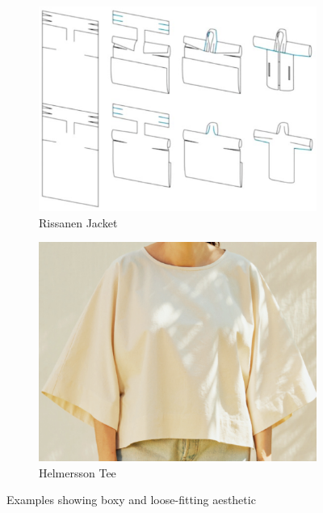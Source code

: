 \begin{figure} [H]
    \centering
    \begin{subfigure}[b]{0.55\textwidth}
        \centering
        \includegraphics[width=\textwidth]{Images/rissanen jacket.png}
        \caption{Rissanen Jacket}
        \label{fig:rissanen_jacket}
    \end{subfigure}
    \hfill
    \begin{subfigure}[b]{0.4\textwidth}
        \centering
        \includegraphics[width=\textwidth]{Images/bh tee.png}
        \caption{Helmersson Tee \cite{helmersson_zero_2023}}
        \label{fig:bh_tee}
    \end{subfigure}
    \caption{Examples showing boxy and loose-fitting aesthetic}
    \label{fig:jacket_tee}
\end{figure}

